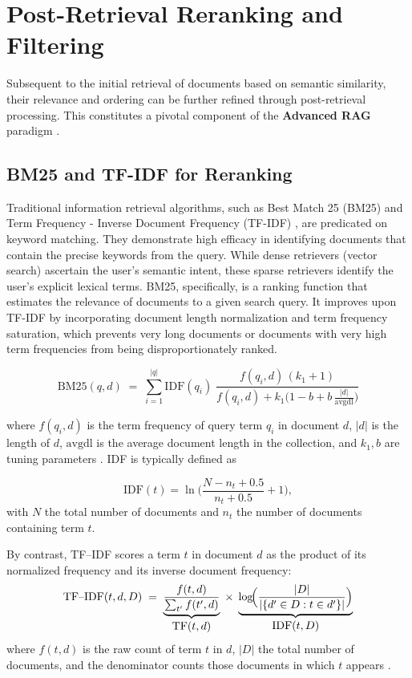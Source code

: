 \section{Post-Retrieval Reranking and Filtering}
Subsequent to the initial retrieval of documents based on semantic similarity, their relevance and ordering can be further refined through post-retrieval processing. This constitutes a pivotal component of the \textbf{Advanced RAG} paradigm \autocite{gao2024retrievalaugmentedgenerationlargelanguage}.

\subsection{BM25 and TF-IDF for Reranking}
Traditional information retrieval algorithms, such as Best Match 25 (BM25) \autocite{robertson1995okapi} and Term Frequency - Inverse Document Frequency (TF-IDF) \autocite{td-idf_sparck, salton1975vector}, are predicated on keyword matching. They demonstrate high efficacy in identifying documents that contain the precise keywords from the query. While dense retrievers (vector search) ascertain the user's semantic intent, these sparse retrievers identify the user's explicit lexical terms. BM25, specifically, is a ranking function that estimates the relevance of documents to a given search query. It improves upon TF-IDF by incorporating document length normalization and term frequency saturation, which prevents very long documents or documents with very high term frequencies from being disproportionately ranked.

\begin{equation}
\text{BM25}(q,d) \;=\; \sum_{i=1}^{|q|} \! \mathrm{IDF}(q_i)\; 
  \frac{f(q_i,d)\,(k_1+1)}{f(q_i,d) + k_1\bigl(1 - b + b\,\frac{|d|}{\mathrm{avgdl}}\bigr)}
\label{eq:bm25}
\end{equation}

where $f(q_i,d)$ is the term frequency of query term $q_i$ in document $d$, $|d|$ is the length of $d$, $\mathrm{avgdl}$ is the average document length in the collection, and $k_1,b$ are tuning parameters \autocite{robertson1995okapi}. IDF is typically defined as

\[
  \mathrm{IDF}(t) = \ln\!\biggl(\frac{N - n_t + 0.5}{n_t + 0.5} + 1\biggr),
\]
with $N$ the total number of documents and $n_t$ the number of documents containing term $t$.

By contrast, TF–IDF scores a term $t$ in document $d$ as the product of its normalized frequency and its inverse document frequency:
\begin{equation}
\text{TF–IDF}(t,d,D) \;=\;
  \underbrace{\frac{f(t,d)}{\sum_{t'} f(t',d)}}_{\displaystyle\mathrm{TF}(t,d)}
  \;\times\;
  \underbrace{\log\!\Bigl(\frac{|D|}{|\{d'\in D: t\in d'\}|}\Bigr)}_{\displaystyle\mathrm{IDF}(t,D)}
\label{eq:tfidf}
\end{equation}
where $f(t,d)$ is the raw count of term $t$ in $d$, $|D|$ the total number of documents, and the denominator counts those documents in which $t$ appears \autocite{salton1975vector,td-idf_sparck}.


